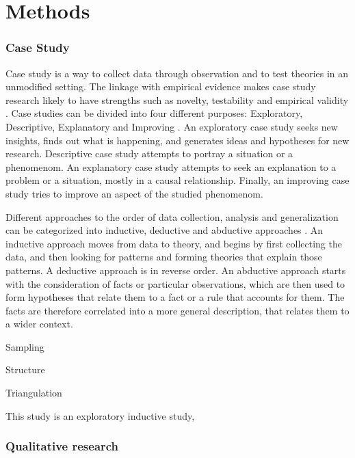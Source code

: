 \chapter{Methods}
\label{chapter:methods} 

\subsection{Case Study}
Case study is a way to collect data through observation and to test theories in an unmodified setting. The linkage with empirical evidence makes case study research likely to have strengths such as novelty, testability and empirical validity \cite{eisenhardt1989building}. Case studies can be divided into four different purposes: Exploratory, Descriptive, Explanatory and Improving \cite{robson2016real}. An exploratory case study seeks new insights, finds out what is happening, and generates ideas and hypotheses for new research. Descriptive case study attempts to portray a situation or a phenomenom. An explanatory case study attempts to seek an explanation to a problem or a situation, mostly in a causal relationship. Finally, an improving case study tries to improve an aspect of the studied phenomenom.

Different approaches to the order of data collection, analysis and generalization can be categorized into inductive, deductive and abductive approaches \cite{dubois2002systematic}. An inductive approach moves from data to theory, and begins by first collecting the data, and then looking for patterns and forming theories that explain those patterns. A deductive approach is in reverse order. An abductive approach starts with the consideration of facts or particular observations, which are then used to form hypotheses that relate them to a fact or a rule that accounts for them. The facts are therefore correlated into a more general description, that relates them to a wider context.

Sampling

Structure \cite{eisenhardt1989building}

Triangulation

This study is an exploratory inductive study, 

\subsection{Qualitative research}





